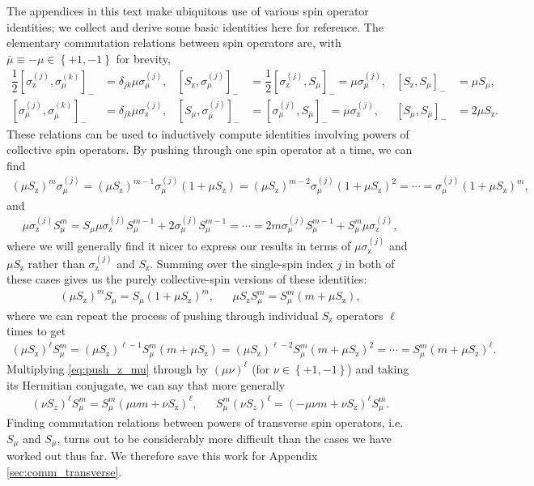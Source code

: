 \documentclass[aps,notitlepage,nofootinbib,11pt]{revtex4-1}
\newcommand{\f}[2]{\dfrac{#1}{#2}} %
\newcommand{\p}[1]{\left(#1\right)} %
\renewcommand{\sp}[1]{\left[#1\right]} %
\renewcommand{\set}[1]{\left\{#1\right\}} %
\newcommand{\z}{\text{z}}
\newcommand{\bmu}{{\bar\mu}}
\newcommand{\1}{\mathds{1}}
\begin{document}
The appendices in this text make ubiquitous use of various spin
operator identities; we collect and derive some basic identities here
for reference.  The elementary commutation relations between spin
operators are, with $\bmu\equiv-\mu\in\set{+1,-1}$ for brevity,
\begin{align}
  \f12 \sp{\sigma_\z^{(j)},\sigma_\mu^{(k)}}_-
  &= \delta_{jk} \mu\sigma_\mu^{(j)},
  &
  \sp{S_\z,\sigma_\mu^{(j)}}_-
  &= \f12 \sp{\sigma_\z^{(j)},S_\mu}_- = \mu\sigma_\mu^{(j)},
  &
  \sp{S_\z,S_\mu}_-
  &= \mu S_\mu,
  \label{eq:comm_z_base} \\
  \sp{\sigma_\mu^{(j)},\sigma_\bmu^{(k)}}_-
  &= \delta_{jk} \mu \sigma_\z^{(j)},
  &
  \sp{S_\mu,\sigma_\bmu^{(j)}}_-
  &= \sp{\sigma_\mu^{(j)},S_\bmu}_- = \mu \sigma_\z^{(j)},
  &
  \sp{S_\mu,S_\bmu}_-
  &= 2 \mu S_\z.
  \label{eq:comm_mu_base}
\end{align}
These relations can be used to inductively compute identities
involving powers of collective spin operators.  By pushing through one
spin operator at a time, we can find
\begin{align}
  \p{\mu S_\z}^m \sigma_\mu^{(j)}
  = \p{\mu S_\z}^{m-1} \sigma_\mu^{(j)} \p{1 + \mu S_\z}
  = \p{\mu S_\z}^{m-2} \sigma_\mu^{(j)} \p{1 + \mu S_\z}^2
  = \cdots
  = \sigma_\mu^{(j)} \p{1 + \mu S_\z}^m,
  \label{eq:push_z_mu_Ss}
\end{align}
and
\begin{align}
  \mu\sigma_\z^{(j)} S_\mu^m
  = S_\mu \mu\sigma_\z^{(j)} S_\mu^{m-1} + 2\sigma_\mu^{(j)} S_\mu^{m-1}
  = \cdots
  = 2m\sigma_\mu^{(j)} S_\mu^{m-1} + S_\mu^m \mu \sigma_\z^{(j)},
  \label{eq:push_z_mu_sS}
\end{align}
where we will generally find it nicer to express our results in terms
of $\mu\sigma_\z^{(j)}$ and $\mu S_\z$ rather than $\sigma_\z^{(j)}$
and $S_\z$.  Summing over the single-spin index $j$ in both of these
cases gives us the purely collective-spin versions of these
identities:
\begin{align}
  \p{\mu S_\z}^m S_\mu = S_\mu \p{1 + \mu S_\z}^m,
  &&
  \mu S_\z S_\mu^m = S_\mu^m \p{m + \mu S_\z},
  \label{eq:push_z_mu_single}
\end{align}
where we can repeat the process of pushing through individual $S_\z$
operators $\ell$ times to get
\begin{align}
  \p{\mu S_\z}^\ell S_\mu^m
  = \p{\mu S_\z}^{\ell-1} S_\mu^m \p{m + \mu S_\z}
  = \p{\mu S_\z}^{\ell-2} S_\mu^m \p{m + \mu S_\z}^2
  = \cdots
  = S_\mu^m \p{m + \mu S_\z}^\ell.
  \label{eq:push_z_mu}
\end{align}
Multiplying \eqref{eq:push_z_mu} through by $\p{\mu\nu}^\ell$ (for
$\nu\in\set{+1,-1}$) and taking its Hermitian conjugate, we can say
that more generally
\begin{align}
  \p{\nu S_z}^\ell S_\mu^m
  = S_\mu^m \p{\mu\nu m+\nu S_\z}^\ell,
  &&
  S_\mu^m \p{\nu S_z}^\ell
  = \p{-\mu\nu m+\nu S_\z}^\ell S_\mu^m.
\end{align}
Finding commutation relations between powers of transverse spin
operators, i.e.~$S_\mu$ and $S_\bmu$, turns out to be considerably
more difficult than the cases we have worked out thus far.  We
therefore save this work for Appendix \ref{sec:comm_transverse}.
\end{document}
